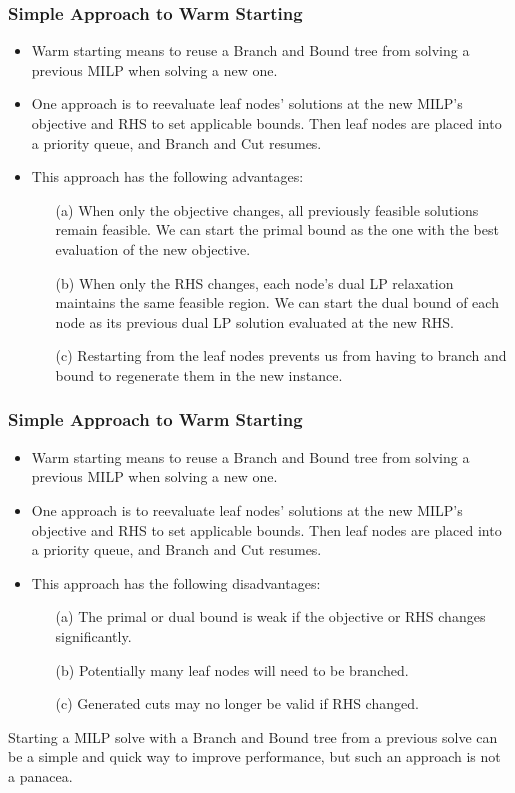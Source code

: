 \documentclass{beamer}
\begin{document}
	\begin{frame}[t]
		\frametitle{Simple Approach to Warm Starting}
		\small
		\begin{itemize}
			\item Warm starting means to reuse a Branch and Bound tree from solving a previous MILP when solving a new one.
			\item One approach is to reevaluate leaf nodes' solutions at the new MILP’s objective and RHS to set applicable bounds. Then leaf nodes are placed into a priority queue, and Branch and Cut resumes.
			\item This approach has the following advantages:
			\begin{itemize}
				\item [(a)] When only the objective changes, all previously feasible solutions remain feasible. We can start the primal bound as the one with the best evaluation of the new objective.
				\item [(b)] When only the RHS changes, each node's dual LP relaxation maintains the same feasible region. We can start the dual bound of each node as its previous dual LP solution evaluated at the new RHS.
				\item [(c)] Restarting from the leaf nodes prevents us from having to branch and bound to regenerate them in the new instance.
			\end{itemize}
		\end{itemize}
		\normalsize
	\end{frame}

	\begin{frame}[t]
		\frametitle{Simple Approach to Warm Starting}
		\small
		\begin{itemize}
			\item Warm starting means to reuse a Branch and Bound tree from solving a previous MILP when solving a new one.
			\item One approach is to reevaluate leaf nodes' solutions at the new MILP’s objective and RHS to set applicable bounds. Then leaf nodes are placed into a priority queue, and Branch and Cut resumes.
			\item This approach has the following disadvantages:
			\begin{itemize}
				\item [(a)] The primal or dual bound is weak if the objective or RHS changes significantly.
				\item [(b)] Potentially many leaf nodes will need to be branched.
				\item [(c)] Generated cuts may no longer be valid if RHS changed.
			\end{itemize}
		\end{itemize}
		\vspace{.5cm}
		\begin{block}{}
			Starting a MILP solve with a Branch and Bound tree from a previous solve can be a simple and quick way to improve performance, but such an approach is not a panacea.
		\end{block}
		\normalsize
	\end{frame}
\end{document}
